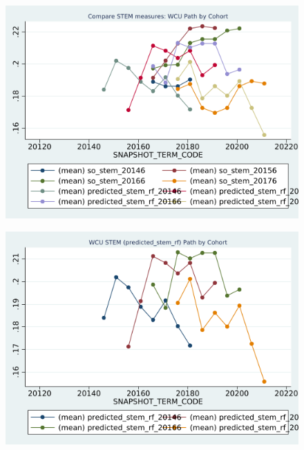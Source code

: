 \begin{figure}[h!]
\begin{centering}
\includegraphics[scale=1]{"figures/WCU_COMPARE_path_by_cohort_CAREER_STEM"}
\end{centering}
\end{figure}
\newpage
\begin{figure}[h!]
\begin{centering}
\includegraphics[scale=1]{"figures/WCU_predicted_stem_rf_path_by_cohort_CAREER_STEM"}
\end{centering}
\end{figure}
\newpage
